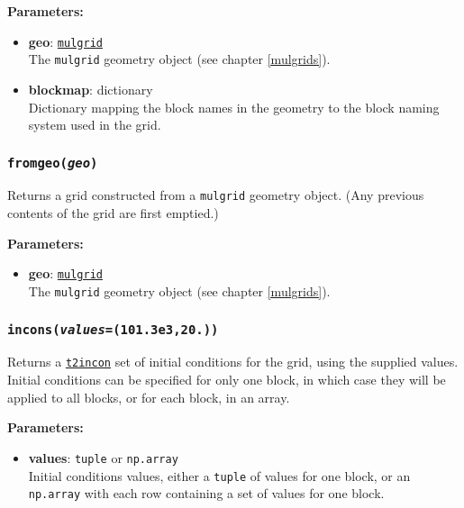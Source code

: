 \textbf{Parameters:}
\begin{itemize}
\item \textbf{geo}: \hyperref[mulgrids]{\texttt{mulgrid}}\\
  The \texttt{mulgrid} geometry object (see chapter \ref{mulgrids}).
\item \textbf{blockmap}: dictionary\\
  Dictionary mapping the block names in the geometry to the block naming system used in the grid.
\end{itemize}

\begin{snugshade}
\subsubsection{\texttt{fromgeo(\emph{geo})}}
\end{snugshade}
\label{sec:t2grid:fromgeo}

Returns a grid constructed from a \texttt{mulgrid} geometry object.  (Any previous contents of the grid are first emptied.)

\textbf{Parameters:}
\begin{itemize}
\item \textbf{geo}: \hyperref[mulgrids]{\texttt{mulgrid}}\\
  The \texttt{mulgrid} geometry object (see chapter \ref{mulgrids}).
\end{itemize}

\begin{snugshade}
\subsubsection{\texttt{incons(\emph{values}=(101.3e3,20.))}}
\end{snugshade}
\label{sec:t2grid:incons}

Returns a \hyperref[incons]{\texttt{t2incon}} set of initial conditions for the grid, using the supplied values.  Initial conditions can be specified for only one block, in which case they will be applied to all blocks, or for each block, in an array.

\textbf{Parameters:}
\begin{itemize}
\item \textbf{values}: \texttt{tuple} or \texttt{np.array}\\
  Initial conditions values, either a \texttt{tuple} of values for one block, or an \texttt{np.array} with each row containing a set of values for one block. 
\end{itemize}

